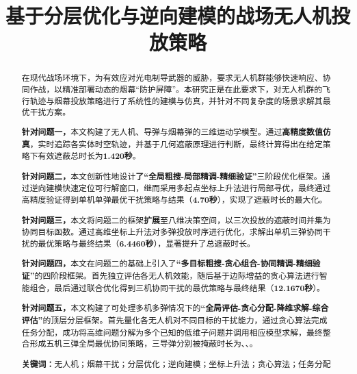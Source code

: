\documentclass[12pt]{article}
\title{ \textbf{基于分层优化与逆向建模的战场无人机投放策略}}
\date{}
\begin{document}
	\begin{CJK}{UTF8}{gbsn}
		
		\maketitle  %
		
		\setcounter{page}{1}
		
		\vspace{-7em}
		\begin{abstract}  %
			\vspace{1em}

			\indent 在现代战场环境下，为有效应对光电制导武器的威胁，要求无人机群能够快速响应、协同作战，以精准部署动态的烟幕“防护屏障”。本研究正是在此要求下，对无人机群的飞行轨迹与烟幕投放策略进行了系统性的建模与仿真，并针对不同复杂度的场景求解其最优干扰方案。
			
			\textbf{针对问题一，}本文构建了无人机、导弹与烟幕弹的三维运动学模型。通过\textbf{高精度数值仿真}，实时追踪各实体时空轨迹，并基于几何遮蔽原理进行判断，最终计算得出在给定策略下有效遮蔽总时长为\textbf{1.420秒}。
			
			\textbf{针对问题二，}本文创新性地设计\textbf{了“全局粗搜-局部精调-精细验证”}三阶段优化框架。通过逆向建模快速定位可行解窗口，继而采用多起点坐标上升法进行局部寻优，最终通过高精度验证得到单机单弹最优干扰策略与结果（\textbf{4.70秒}），实现了遮蔽时长的最大化。
			
			\textbf{针对问题三，}本文将问题二的框架\textbf{扩展}至八维决策空间，以三次投放的遮蔽时间并集为协同目标函数。通过高维坐标上升法对多弹投放时序进行优化，求解出单机三弹协同干扰的最优策略与最终结果（\textbf{6.4460秒}），显著提升了总遮蔽时长。
			
			\textbf{针对问题四，}本文在问题二的基础上引入了\textbf{“多目标粗搜-贪心组合-协同精调-精细验证”}的四阶段框架。首先独立评估各无人机效能，随后基于边际增益的贪心算法进行智能组合，最后通过联合优化得到三机协同干扰的最优策略与最终结果（\textbf{12.1670秒}）。
			
			\textbf{针对问题五，}本文构建了可处理多机多弹情况下的\textbf{“全局评估-贪心分配-降维求解-综合评估”}的顶层分层框架。首先量化各无人机对不同目标的干扰能力，通过贪心算法完成任务分配，成功将高维问题分解为多个已知的低维子问题并调用相应模型求解，最终整合形成五机三弹全局最优协同策略，三导弹分别被掩蔽时长为\textbf{}、\textbf{}、\textbf{}。
			
			\bigskip %
			\noindent
			\textbf{关键词：}无人机；烟幕干扰；分层优化；逆向建模；坐标上升法；贪心算法；任务分配
			

\end{abstract}
\end{CJK}
\end{document}
